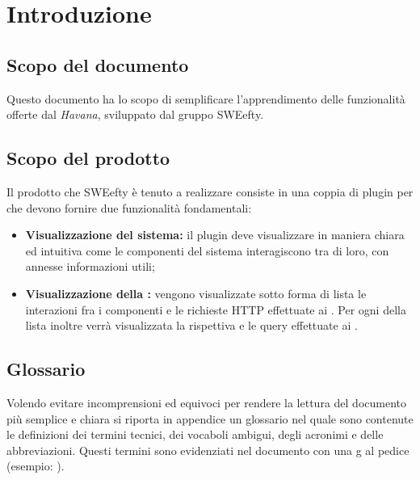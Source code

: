 \section{Introduzione}
\label{sec:intro}
	\subsection{Scopo del documento}
	Questo documento ha lo scopo di semplificare l'apprendimento delle funzionalità offerte dal  \emph{Havana},  sviluppato dal gruppo SWEefty.
	
	\subsection{Scopo del prodotto}
	Il prodotto che SWEefty è tenuto a realizzare consiste in una coppia di plugin per  che devono fornire due funzionalità fondamentali:
	\begin{itemize}
		\item \textbf{Visualizzazione  del sistema:} il plugin deve visualizzare in maniera chiara ed intuitiva come le componenti del sistema interagiscono tra di loro, con annesse informazioni utili;
		\item \textbf{Visualizzazione della :} vengono visualizzate sotto forma di lista le interazioni fra i componenti e le richieste HTTP effettuate ai . Per ogni  della lista inoltre verrà visualizzata la rispettiva  e le query effettuate ai .
	\end{itemize}

	\subsection{Glossario}
	Volendo evitare incomprensioni ed equivoci per rendere la lettura del documento più semplice
	e chiara si riporta in appendice un glossario nel quale sono contenute le definizioni dei
	termini tecnici, dei vocaboli ambigui, degli acronimi e delle abbreviazioni. Questi termini
	sono evidenziati nel documento con una g al pedice (esempio: ).